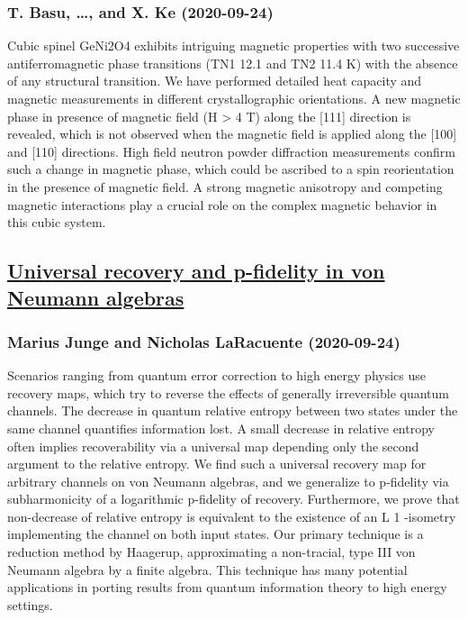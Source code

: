 \subsubsection*{T. Basu, \dots, and X. Ke (2020-09-24)}
Cubic spinel GeNi2O4 exhibits intriguing magnetic properties with two
successive antiferromagnetic phase transitions (TN1 12.1 and TN2 11.4 K) with
the absence of any structural transition. We have performed detailed heat
capacity and magnetic measurements in different crystallographic orientations.
A new magnetic phase in presence of magnetic field (H > 4 T) along the [111]
direction is revealed, which is not observed when the magnetic field is applied
along the [100] and [110] directions. High field neutron powder diffraction
measurements confirm such a change in magnetic phase, which could be ascribed
to a spin reorientation in the presence of magnetic field. A strong magnetic
anisotropy and competing magnetic interactions play a crucial role on the
complex magnetic behavior in this cubic system.

\subsection*{\href{http://arxiv.org/abs/2009.11866v1}{Universal recovery and p-fidelity in von Neumann algebras}}
\subsubsection*{Marius Junge and Nicholas LaRacuente (2020-09-24)}
Scenarios ranging from quantum error correction to high energy physics use
recovery maps, which try to reverse the effects of generally irreversible
quantum channels. The decrease in quantum relative entropy between two states
under the same channel quantifies information lost. A small decrease in
relative entropy often implies recoverability via a universal map depending
only the second argument to the relative entropy. We find such a universal
recovery map for arbitrary channels on von Neumann algebras, and we generalize
to p-fidelity via subharmonicity of a logarithmic p-fidelity of recovery.
Furthermore, we prove that non-decrease of relative entropy is equivalent to
the existence of an L 1 -isometry implementing the channel on both input
states. Our primary technique is a reduction method by Haagerup, approximating
a non-tracial, type III von Neumann algebra by a finite algebra. This technique
has many potential applications in porting results from quantum information
theory to high energy settings.

